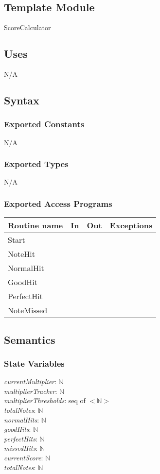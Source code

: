 \documentclass[12pt]{article}
\begin{document}
\subsection{Template Module}
ScoreCalculator

\subsection {Uses}
N/A

\subsection {Syntax}

\subsubsection {Exported Constants}
N/A

\subsubsection {Exported Types}
N/A

\subsubsection {Exported Access Programs}

\begin{tabular}{| l | l | l | l |}
\hline
\textbf{Routine name} & \textbf{In} & \textbf{Out} & \textbf{Exceptions}\\
\hline
Start & & &\\
\hline
NoteHit & & & \\
\hline
NormalHit & & & \\
\hline
GoodHit & & & \\
\hline
PerfectHit & & & \\
\hline
NoteMissed & & & \\
\hline
\end{tabular}

\subsection {Semantics}

\subsubsection {State Variables}
\textit{currentMultiplier}: $\mathbb{N}$\\
\textit{multiplierTracker}: $\mathbb{N} $ \\
\textit{multiplierThresholds}: seq of $<\mathbb{N}>$ \\
\textit{totalNotes}: $\mathbb{N} $ \\
\textit{normalHits}: $\mathbb{N} $ \\
\textit{goodHits}: $\mathbb{N} $ \\
\textit{perfectHits}: $\mathbb{N} $ \\
\textit{missedHits}: $\mathbb{N} $ \\
\textit{currentScore}: $\mathbb{N} $ \\
\textit{totalNotes}: $\mathbb{N}$
\end{document}
